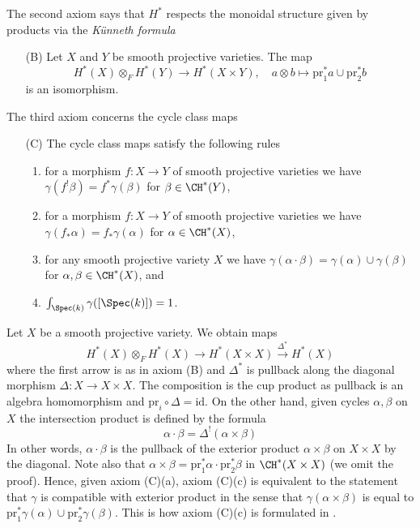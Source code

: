 \noindent
The second axiom says that $H^*$ respects the monoidal structure
given by products via the {\it K\"unneth formula}
\begin{enumerate}
\item[(B)] Let $X$ and $Y$ be smooth projective varieties. The map
$$
H^*(X) \otimes_F H^*(Y) \to H^*(X \times Y),\quad
a \otimes b \mapsto \text{pr}_1^*a \cup \text{pr}_2^*b
$$
is an isomorphism.
\end{enumerate}
The third axiom concerns the cycle class maps
\begin{enumerate}
\item[(C)] The cycle class maps satisfy the following rules
\begin{enumerate}
\item for a morphism $f : X \to Y$ of smooth projective varieties
we have $\gamma(f^!\beta) = f^*\gamma(\beta)$ for $\beta \in \CH^*(Y)$,
\item for a morphism $f : X \to Y$ of smooth projective varieties we have
$\gamma(f_*\alpha) = f_*\gamma(\alpha)$ for $\alpha \in \CH^*(X)$,
\item for any smooth projective variety $X$ we have
$\gamma(\alpha \cdot \beta) = \gamma(\alpha) \cup \gamma(\beta)$
for $\alpha, \beta \in \CH^*(X)$, and
\item $\int_{\Spec(k)} \gamma([\Spec(k)]) = 1$.
\end{enumerate}
\end{enumerate}

\begin{remark}
\label{remark-replace-cup-product-classical}
Let $X$ be a smooth projective variety. We obtain maps
$$
H^*(X) \otimes_F H^*(X) \longrightarrow H^*(X \times X)
\xrightarrow{\Delta^*} H^*(X)
$$
where the first arrow is as in axiom (B) and $\Delta^*$
is pullback along the diagonal morphism $\Delta : X \to X \times X$.
The composition is the cup product as pullback is an algebra homomorphism and
$\text{pr}_i \circ \Delta = \text{id}$.
On the other hand, given cycles $\alpha, \beta$ on $X$ 
the intersection product is defined by the formula
$$
\alpha \cdot \beta =
\Delta^!(\alpha \times \beta)
$$
In other words, $\alpha \cdot \beta$ is the pullback of the
exterior product $\alpha \times \beta$ on $X \times X$ by
the diagonal. Note also that
$\alpha \times \beta = \text{pr}_1^*\alpha \cdot \text{pr}_2^*\beta$
in $\CH^*(X \times X)$ (we omit the proof). Hence, given axiom (C)(a),
axiom (C)(c) is equivalent to the statement that $\gamma$ is
compatible with exterior product in the sense that
$\gamma(\alpha \times \beta)$ is equal to
$\text{pr}_1^*\gamma(\alpha) \cup \text{pr}_2^*\gamma(\beta)$.
This is how axiom (C)(c) is formulated in \cite{Kleiman-cycles}.
\end{remark}

